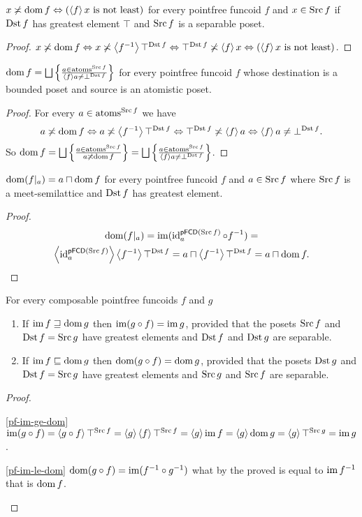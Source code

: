 \begin{prop}
$x\nasymp\dom f\Leftrightarrow(\supfun fx\text{ is not least})$ for
every pointfree funcoid $f$ and $x\in\Src f$ if $\Dst f$ has greatest
element $\top$ and $\Src f$ is a separable poset.\end{prop}
\begin{proof}
$x\nasymp\dom f\Leftrightarrow x\nasymp\supfun{f^{-1}}\top^{\Dst f}\Leftrightarrow\top^{\Dst f}\nasymp\supfun fx\Leftrightarrow(\supfun fx\text{ is not least})$.\end{proof}
\begin{prop}
$\dom f=\bigsqcup\setcond{a\in\atoms^{\Src f}}{\supfun fa\ne\bot^{\Dst f}}$
for every pointfree funcoid $f$ whose destination is a bounded poset
and source is an atomistic poset.\end{prop}
\begin{proof}
For every $a\in\atoms^{\Src f}$ we have 
\[
a\nasymp\dom f\Leftrightarrow a\nasymp\supfun{f^{-1}}\top^{\Dst f}\Leftrightarrow\top^{\Dst f}\nasymp\supfun fa\Leftrightarrow\supfun fa\ne\bot^{\Dst f}.
\]
So $\dom f=\bigsqcup\setcond{a\in\atoms^{\Src f}}{a\nasymp\dom f}=\bigsqcup\setcond{a\in\atoms^{\Src f}}{\supfun fa\ne\bot^{\Dst f}}$.\end{proof}
\begin{prop}
$\dom(f|_{a})=a\sqcap\dom f$ for every pointfree funcoid $f$ and
$a\in\Src f$ where $\Src f$ is a meet-semilattice and
$\Dst f$ has greatest element.\end{prop}
\begin{proof}
~
\begin{multline*}
\dom(f|_{a})=\im(\id_{a}^{\mathsf{pFCD}(\Src f)}\circ f^{-1})=\\
\supfun{\id_{a}^{\mathsf{pFCD}(\Src f)}}\supfun{f^{-1}}\top^{\Dst f}=a\sqcap\supfun{f^{-1}}\top^{\Dst f}=a\sqcap\dom f.
\end{multline*}
\end{proof}
\begin{prop}
For every composable pointfree funcoids $f$ and $g$
\begin{enumerate}
\item \label{pf-im-ge-dom}If $\im f\sqsupseteq\dom g$ then $\im(g\circ f)=\im g$, provided that
the posets $\Src f$ and $\Dst f=\Src g$ have greatest elements and $\Dst f$
and $\Dst g$ are separable.
\item \label{pf-im-le-dom}If $\im f\sqsubseteq\dom g$ then $\dom(g\circ f)=\dom g$, provided that
the posets $\Dst g$ and $\Dst f=\Src g$ have greatest elements and $\Src g$
and $\Src f$ are separable.
\end{enumerate}
\end{prop}
\begin{proof}
~
\begin{widedisorder}
\item [{\ref{pf-im-ge-dom}}] $\im(g\circ f)=\supfun{g\circ f}\top^{\Src f}=\supfun g\supfun f\top^{\Src f}=\supfun g\im f=\supfun g\dom g=\supfun g\top^{\Src g}=\im g$.
\item [{\ref{pf-im-le-dom}}] $\dom(g\circ f)=\im(f^{-1}\circ g^{-1})$
what by the proved is equal to $\im f^{-1}$ that is $\dom f$.
\end{widedisorder}
\end{proof}

